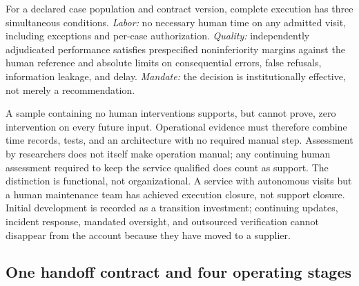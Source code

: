 For a declared case population and contract version, complete execution has three simultaneous
conditions. \emph{Labor:} no necessary human time on any admitted visit, including exceptions and
per-case authorization. \emph{Quality:} independently adjudicated performance satisfies prespecified
noninferiority margins against the human reference and absolute limits on consequential errors, false
refusals, information leakage, and delay. \emph{Mandate:} the decision is institutionally effective,
not merely a recommendation.

A sample containing no human interventions supports, but cannot prove, zero intervention on every
future input. Operational evidence must therefore combine time records, tests, and an architecture
with no required manual step. Assessment by researchers does not itself make operation manual; any
continuing human assessment required to keep the service qualified does count as support. The
distinction is functional, not organizational. A service with autonomous visits but a human
maintenance team has achieved execution closure, not support closure. Initial development is recorded
as a transition investment; continuing updates, incident response, mandated oversight, and outsourced
verification cannot disappear from the account because they have moved to a supplier.

\subsection{One handoff contract and four operating stages}
\label{sec:stages}

